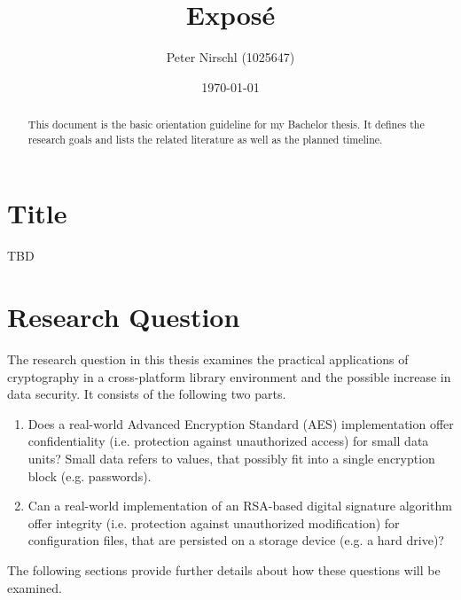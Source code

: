 \documentclass[a4paper]{article}
\title{Exposé}
\author{Peter Nirschl (1025647)}
\date{\today} %
\begin{document}
\maketitle
\begin{abstract}
This document is the basic orientation guideline for my Bachelor thesis.
It defines the research goals and lists the related literature as well as the planned timeline.
\end{abstract}
\setcounter{tocdepth}{1} %
\tableofcontents
\newpage

\section{Title}

TBD


\section{Research Question}

The research question in this thesis examines the practical applications of cryptography in a cross-platform library environment and the possible increase in data security.
It consists of the following two parts.

\begin{enumerate}
\item Does a real-world Advanced Encryption Standard (AES) implementation offer confidentiality (i.e. protection against unauthorized access) for small data units?
Small data refers to values, that possibly fit into a single encryption block (e.g. passwords).
      
\item Can a real-world implementation of an RSA-based digital signature algorithm offer integrity (i.e. protection against unauthorized modification) for configuration files, that are persisted on a storage device (e.g. a hard drive)?

\end{enumerate}

The following sections provide further details about how these questions will be examined.
\end{document}
